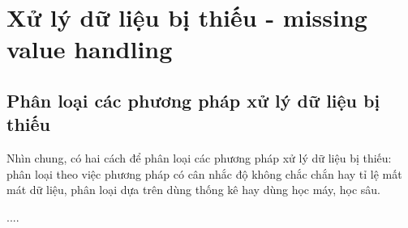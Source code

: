 \section{Xử lý dữ liệu bị thiếu - missing value handling}
\subsection{Phân loại các phương pháp xử lý dữ liệu bị thiếu}
Nhìn chung, có hai cách để phân loại các phương pháp xử lý dữ liệu bị thiếu: phân loại theo việc phương pháp có cân nhắc độ không chắc chắn hay tỉ lệ mất mát dữ liệu, phân loại dựa trên dùng thống kê hay dùng học máy, học sâu.

....


